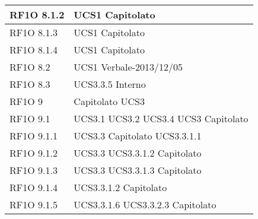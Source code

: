 \begin{center}
\begin{longtable}{ | p{5cm} | p{5cm} |}
        RF1O 8.1.2 &  UCS1 \newline  Capitolato \newline  \\ \hline      
        RF1O 8.1.3  &  UCS1 \newline  Capitolato \newline  \\ \hline      
        RF1O 8.1.4  &  UCS1 \newline  Capitolato \newline  \\ \hline      
        RF1O 8.2  &  UCS1 \newline  Verbale-2013/12/05 \newline  \\ \hline      
        RF1O 8.3 &  UCS3.3.5 \newline  Interno \newline  \\ \hline      
        RF1O 9  &  Capitolato \newline  UCS3 \newline  \\ \hline      
        RF1O 9.1  &  UCS3.1 \newline  UCS3.2 \newline  UCS3.4 \newline  UCS3 \newline  Capitolato \newline  \\ \hline      
        RF1O 9.1.1  &  UCS3.3 \newline  Capitolato \newline  UCS3.3.1.1 \newline  \\ \hline      
        RF1O 9.1.2  &  UCS3.3 \newline  UCS3.3.1.2 \newline  Capitolato \newline  \\ \hline      
        RF1O 9.1.3  &  UCS3.3 \newline  UCS3.3.1.3 \newline  Capitolato \newline  \\ \hline      
        RF1O 9.1.4  &  UCS3.3.1.2 \newline  Capitolato \newline  \\ \hline      
        RF1O 9.1.5 &  UCS3.3.1.6 \newline  UCS3.3.2.3 \newline  Capitolato \newline  \\ \hline      

\end{longtable}
\end{center}
